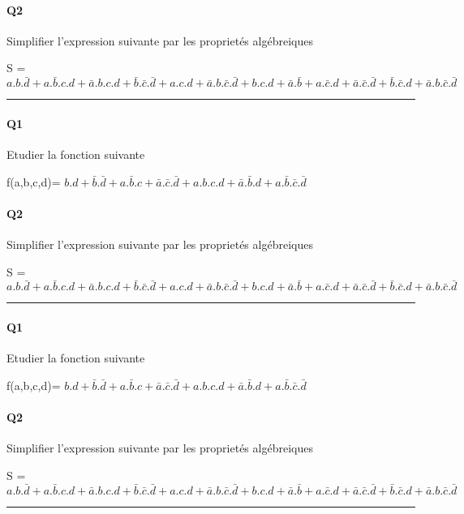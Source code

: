 \paragraph{Q2}

Simplifier l'expression suivante par les proprietés algébreiques 

S = $a.b.\bar d+a.\bar b.c.d+\bar a.b.c.d+\bar b.\bar c.\bar d + a.c.d+\bar a.b.\bar c.\bar d + b.c.d+\bar a.\bar b+a.\bar c.d+\bar a.\bar c.\bar d + \bar b.\bar c.d+\bar a.b.\bar c.\bar d$

\hrule width 1\linewidth
\paragraph{Q1}

Etudier la fonction suivante

f(a,b,c,d)= $b.d+\bar b.\bar d+a.\bar b.c+\bar a.\bar c.\bar d + a.b.c.d+\bar a.\bar b.d+a.\bar b.\bar c.\bar d$

\paragraph{Q2}

Simplifier l'expression suivante par les proprietés algébreiques 

S = $a.b.\bar d+a.\bar b.c.d+\bar a.b.c.d+\bar b.\bar c.\bar d + a.c.d+\bar a.b.\bar c.\bar d + b.c.d+\bar a.\bar b+a.\bar c.d+\bar a.\bar c.\bar d + \bar b.\bar c.d+\bar a.b.\bar c.\bar d$

\hrule width 1\linewidth
\paragraph{Q1}

Etudier la fonction suivante

f(a,b,c,d)= $b.d+\bar b.\bar d+a.\bar b.c+\bar a.\bar c.\bar d + a.b.c.d+\bar a.\bar b.d+a.\bar b.\bar c.\bar d$

\paragraph{Q2}

Simplifier l'expression suivante par les proprietés algébreiques 

S = $a.b.\bar d+a.\bar b.c.d+\bar a.b.c.d+\bar b.\bar c.\bar d + a.c.d+\bar a.b.\bar c.\bar d + b.c.d+\bar a.\bar b+a.\bar c.d+\bar a.\bar c.\bar d + \bar b.\bar c.d+\bar a.b.\bar c.\bar d$

\hrule width 1\linewidth
